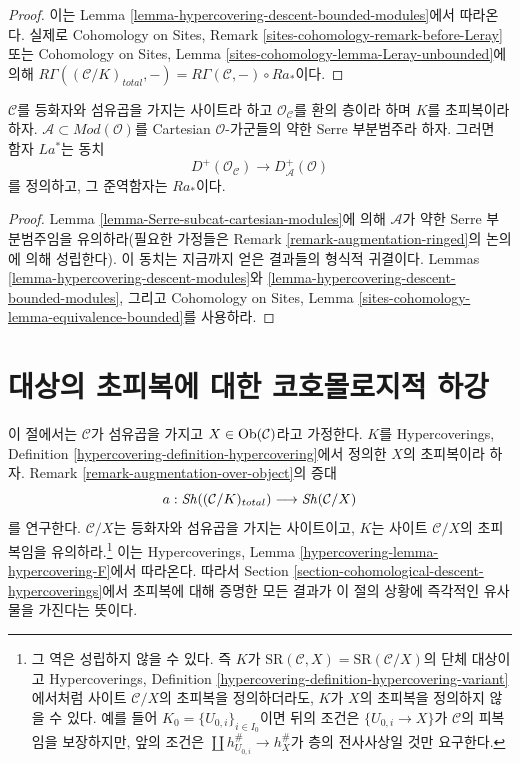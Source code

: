 \begin{proof}
이는 Lemma \ref{lemma-hypercovering-descent-bounded-modules}에서 따라온다.
실제로 Cohomology on Sites, Remark
\ref{sites-cohomology-remark-before-Leray} 또는 Cohomology on Sites,
Lemma \ref{sites-cohomology-lemma-Leray-unbounded}에 의해\newline
$R\Gamma((\mathcal{C}/K)_{total}, -) =
R\Gamma(\mathcal{C}, -) \circ Ra_*$이다.
\end{proof}

\begin{lemma}
\label{lemma-hypercovering-equivalence-bounded-modules}
$\mathcal{C}$를 등화자와 섬유곱을 가지는 사이트라 하고
$\mathcal{O}_\mathcal{C}$를 환의 층이라 하며 $K$를 초피복이라 하자.
$\mathcal{A} \subset \textit{Mod}(\mathcal{O})$를 Cartesian
$\mathcal{O}$-가군들의 약한 Serre 부분범주라 하자. 그러면 함자
$La^*$는 동치
$$
D^+(\mathcal{O}_\mathcal{C}) \longrightarrow D_\mathcal{A}^+(\mathcal{O})
$$
를 정의하고, 그 준역함자는 $Ra_*$이다.
\end{lemma}

\begin{proof}
Lemma \ref{lemma-Serre-subcat-cartesian-modules}에 의해
$\mathcal{A}$가 약한 Serre 부분범주임을 유의하라(필요한 가정들은
Remark \ref{remark-augmentation-ringed}의 논의에 의해 성립한다).
이 동치는 지금까지 얻은 결과들의 형식적 귀결이다. Lemmas
\ref{lemma-hypercovering-descent-modules}와
\ref{lemma-hypercovering-descent-bounded-modules}, 그리고 Cohomology on
Sites, Lemma \ref{sites-cohomology-lemma-equivalence-bounded}를 사용하라.
\end{proof}

\section{대상의 초피복에 대한 코호몰로지적 하강}
\label{section-cohomological-descent-hypercoverings-X}

\noindent
이 절에서는 $\mathcal{C}$가 섬유곱을 가지고
$X \in \mathop{\mathrm{Ob}}\nolimits(\mathcal{C})$라고 가정한다. $K$를 Hypercoverings,
Definition \ref{hypercovering-definition-hypercovering}에서 정의한
$X$의 초피복이라 하자. Remark \ref{remark-augmentation-over-object}의 증대
$$
a : \mathop{\mathit{Sh}}\nolimits((\mathcal{C}/K)_{total}) \longrightarrow \mathop{\mathit{Sh}}\nolimits(\mathcal{C}/X)
$$
를 연구한다. $\mathcal{C}/X$는 등화자와 섬유곱을 가지는 사이트이고,
$K$는 사이트 $\mathcal{C}/X$의 초피복임을 유의하라.\footnote{그 역은
성립하지 않을 수 있다. 즉 $K$가
$\text{SR}(\mathcal{C}, X) = \text{SR}(\mathcal{C}/X)$의 단체 대상이고
Hypercoverings, Definition
\ref{hypercovering-definition-hypercovering-variant}에서처럼 사이트
$\mathcal{C}/X$의 초피복을 정의하더라도, $K$가 $X$의 초피복을
정의하지 않을 수 있다. 예를 들어 $K_0 = \{U_{0, i}\}_{i \in I_0}$이면
뒤의 조건은 $\{U_{0, i} \to X\}$가 $\mathcal{C}$의 피복임을 보장하지만,
앞의 조건은 $\coprod h_{U_{0, i}}^\# \to h_X^\#$가 층의 전사사상일
것만 요구한다.} 이는 Hypercoverings, Lemma
\ref{hypercovering-lemma-hypercovering-F}에서 따라온다. 따라서 Section
\ref{section-cohomological-descent-hypercoverings}에서 초피복에 대해
증명한 모든 결과가 이 절의 상황에 즉각적인 유사물을 가진다는 뜻이다.

